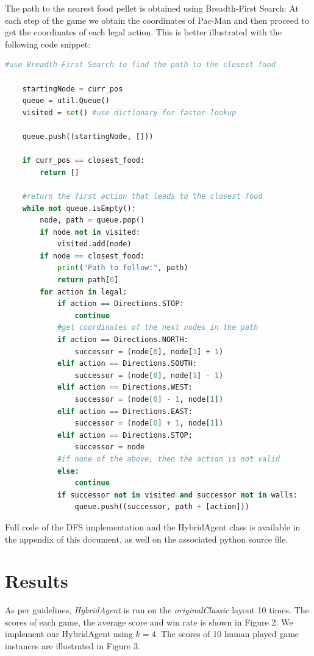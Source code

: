 \documentclass{article}
\begin{document}
	The path to the nearest food pellet is obtained using Breadth-First Search: At each step of the game we obtain the coordinates of Pac-Man and then proceed to get the coordinates of each legal action. This is better illustrated with the following code snippet:
	
	\begin{lstlisting}[language=Python]
	#use Breadth-First Search to find the path to the closest food
	
	startingNode = curr_pos 
	queue = util.Queue()
	visited = set() #use dictionary for faster lookup
		
	queue.push((startingNode, []))
	
	if curr_pos == closest_food:
	    return []
		
	#return the first action that leads to the closest food
	while not queue.isEmpty():
		node, path = queue.pop()
		if node not in visited:
		    visited.add(node)
		if node == closest_food:
		    print("Path to follow:", path)
		    return path[0]
		for action in legal:
		    if action == Directions.STOP:
		        continue	
		    #get coordinates of the next nodes in the path
		    if action == Directions.NORTH:
		        successor = (node[0], node[1] + 1)
		    elif action == Directions.SOUTH:
		        successor = (node[0], node[1] - 1)
		    elif action == Directions.WEST:
		        successor = (node[0] - 1, node[1])
		    elif action == Directions.EAST:
		        successor = (node[0] + 1, node[1])
		    elif action == Directions.STOP:
		        successor = node
		    #if none of the above, then the action is not valid
		    else:
		        continue
		    if successor not in visited and successor not in walls:
		        queue.push((successor, path + [action]))		
	\end{lstlisting}

Full code of the DFS implementation and the HybridAgent class is available in the appendix of this document, as well on the associated python source file. 
\newpage

\section{Results}

As per guidelines, \textit{HybridAgent} is run on the \textit{originalClassic} layout 10 times. The scores of each game, the average score and win rate is shown in Figure 2. We implement our HybridAgent using $k=4$. The scores of 10 human played game instances are illustrated in Figure 3. \\
\end{document}

